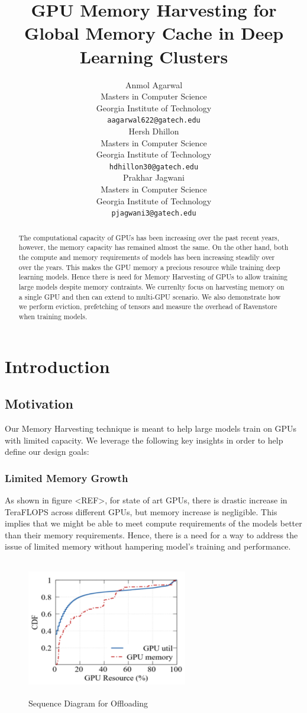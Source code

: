 \documentclass{article}
\title{GPU Memory Harvesting for Global Memory Cache in Deep Learning Clusters}
\author{Anmol Agarwal \\
	Masters in Computer Science\\
	Georgia Institute of Technology\\
	\texttt{aagarwal622@gatech.edu} \\
	\And
	Hersh Dhillon \\
	Masters in Computer Science\\
	Georgia Institute of Technology\\
	\texttt{hdhillon30@gatech.edu} \\
	\And
	Prakhar Jagwani \\
	Masters in Computer Science\\
	Georgia Institute of Technology\\
	\texttt{pjagwani3@gatech.edu} \\
}
\begin{document}
\maketitle

\begin{abstract}
The computational capacity of GPUs has been increasing over the past recent years, however, the memory capacity
has remained almost the same. On the other hand, both the compute and memory requirements of
models has been increasing steadily over over the years. This makes the GPU memory a 
precious resource while training deep learning models. Hence there is need for 
Memory Harvesting of GPUs to allow training large models despite memory contraints. We
currenlty focus on harvesting memory on a single GPU and then can extend to multi-GPU scenario.
We also demonstrate how we perform eviction, prefetching of tensors and measure the overhead
of Ravenstore when training models.
\end{abstract}




\section{Introduction}
\subsection{Motivation}
Our Memory Harvesting technique is meant to help large models train on GPUs with limited capacity.
We leverage the following key insights in order to help define our design goals:
	\subsubsection{Limited Memory Growth}As shown in figure <REF>, for state of 
	art GPUs, there is drastic increase in TeraFLOPS across different GPUs, but memory increase is negligible.
	This implies that we might be able to meet compute requirements of the models better than their memory requirements.
	Hence, there is a need for a way to address the issue of limited memory without hampering model's training and performance.
	\begin{figure}[!htbp]
		\centering
		\includegraphics[height=6cm, width=7cm]{figures/AlibabaUtil.png}
		\caption{Sequence Diagram for Offloading}
	\end{figure}
	\FloatBarrier
\end{document}

